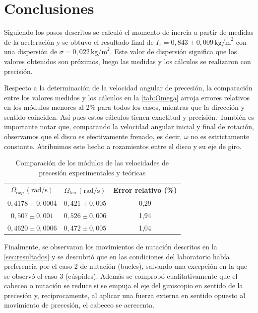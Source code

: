 \documentclass[a4paper]{article}
\begin{document}
\section{Conclusiones}
Siguiendo los pasos descritos se calculó el momento de inercia a partir de medidas de la aceleración y se obtuvo el resultado final de $I_z=0,843\pm 0,009\,\text{kg/m}^2$ con una dispersión de $\sigma=0,022\,\text{kg/m}^2$. Este valor de dispersión significa que los valores obtenidos son próximos, luego las medidas y los cálculos se realizaron con precisión.

Respecto a la determinación de la velocidad angular de precesión, la comparación entre los valores medidos y los cálculos en la \autoref{tab:Omega} arroja errores relativos en los módulos menores al 2\% para todos los casos, mientras que la dirección y sentido coinciden. Así pues estos cálculos tienen exactitud y precisión. También es importante notar que, comparando la velocidad angular inicial y final de rotación, observamos que el disco es efectivamente frenado, es decir, $\omega$ no es estrictamente constante. Atribuimos este hecho a rozamientos entre el disco y su eje de giro.

\begin{table}[h]
\begin{center}
\begin{tabular}{|c|c|c|}
\hline
$\Omega_{exp}\,\left(\text{rad/s}\right)$ & $\Omega_{teo}\,\left(\text{rad/s}\right)$ & Error relativo (\%)\\
\hline
$0,4178\pm 0,0004$ & $0,421\pm 0,005$ & 0,29 \\
\hline
$0,507\pm 0,001$ & $0,526\pm 0,006$ & 1,94\\
\hline
$0,4620\pm 0,0006$ & $0,472\pm 0,005$ & 1,04\\
\hline
\end{tabular}
\caption{Comparación de los módulos de las velocidades de precesión experimentales y teóricas}
\label{tab:Omega}
\end{center}
\end{table}

Finalmente, se observaron los movimientos de nutación descritos en la  \eqref{sec:resultados} y se descubrió que en las condiciones del laboratorio había preferencia por el caso 2 de nutación (bucles), salvando una excepción en la que se observó el caso 3 (cúspides). Además se comprobó cualitativamente que el cabeceo o nutación se reduce si se empuja el eje del giroscopio en sentido de la precesión y, recíprocamente, al aplicar una fuerza externa en sentido opuesto al movimiento de precesión, el cabeceo se acrecenta.
\end{document}
